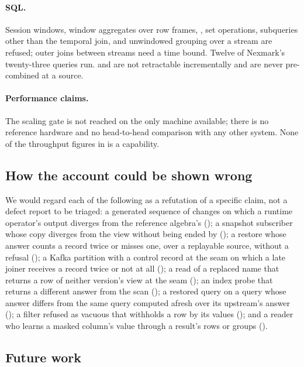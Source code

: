 \documentclass[11pt,a4paper]{article}
\renewcommand{\_}{\oldunderscore\allowbreak}
\newcommand{\code}[1]{\texttt{\pvbreakable{#1}}}
\begin{document}
\paragraph{SQL.} Session windows, window aggregates over row frames, \code{ORDER BY}, set operations,
subqueries other than the temporal join, and unwindowed grouping over a stream are refused; outer joins
between streams need a time bound. Twelve of Nexmark's twenty-three queries run. \code{MIN} and
\code{MAX} are not retractable incrementally and are never pre-combined at a source.

\paragraph{Performance claims.} The scaling gate is not reached on the only machine available; there is
no reference hardware and no head-to-head comparison with any other system. None of the throughput
figures in  is a capability.

\subsection{How the account could be shown wrong}

We would regard each of the following as a refutation of a specific claim, not a defect report to be
triaged: a generated sequence of changes on which a runtime operator's output diverges from the
reference algebra's (); a snapshot subscriber whose copy diverges from the view without
being ended by \code{PRV-6105} (); a restore whose answer counts a record twice or
misses one, over a replayable source, without a refusal (); a Kafka partition with a
control record at the seam on which a late joiner receives a record twice or not at all
(); a read of a replaced name that returns a row of neither version's view at the seam
(); an index probe that returns a different answer from the scan
(); a restored query on a query whose answer differs from the same
query computed afresh over its upstream's answer (); a filter refused as vacuous that
withholds a row by its values (); and a reader who learns a masked column's value
through a result's rows or groups ().

\subsection{Future work}
\end{document}

